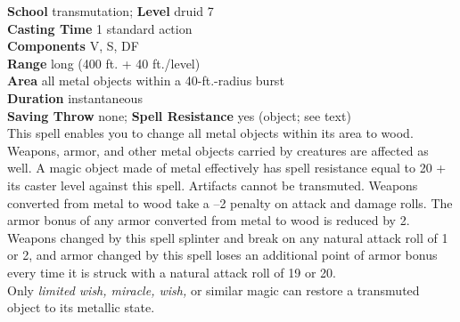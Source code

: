 \textbf{School} transmutation; \textbf{Level} druid 7\\
\textbf{Casting Time} 1 standard action\\
\textbf{Components} V, S, DF\\
\textbf{Range} long (400 ft. + 40 ft./level)\\
\textbf{Area} all metal objects within a 40-ft.-radius burst\\
\textbf{Duration} instantaneous\\
\textbf{Saving Throw} none; \textbf{Spell Resistance} yes (object; see text)\\
This spell enables you to change all metal objects within its area to wood. Weapons, armor, and other metal objects carried by creatures are affected as well. A magic object made of metal effectively has spell resistance equal to 20 + its caster level against this spell. Artifacts cannot be transmuted. Weapons converted from metal to wood take a –2 penalty on attack and damage rolls. The armor bonus of any armor converted from metal to wood is reduced by 2. Weapons changed by this spell splinter and break on any natural attack roll of 1 or 2, and armor changed by this spell loses an additional point of armor bonus every time it is struck with a natural attack roll of 19 or 20.\\
Only \textit{limited wish, miracle, wish, }or similar magic can restore a transmuted object to its metallic state.\\
